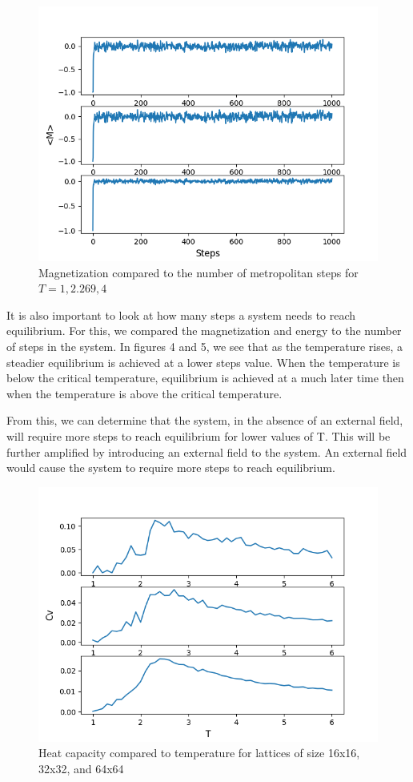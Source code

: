 \documentclass[pra,twocolumn,showpacs,amsmath,amssymb]{revtex4-2}
\begin{document}
\begin{figure}[t!]
\includegraphics[scale=0.50]{m_steps.png}
\caption{Magnetization compared to the number of metropolitan steps for $T = 1, 2.269, 4$}\label{autocorr}
\end{figure}

\par It is also important to look at how many steps a system needs to reach equilibrium. For this, we compared the magnetization and energy to the number of steps in the system. In figures 4 and 5, we see that as the temperature rises, a steadier equilibrium is achieved at a lower steps value. When the temperature is below the critical temperature, equilibrium is achieved at a much later time then when the temperature is above the critical temperature.
\par From this, we can determine that the system, in the absence of an external field, will require more steps to reach equilibrium for lower values of T. This will be further amplified by introducing an external field to the system. An external field would cause the system to require more steps to reach equilibrium.

\begin{figure}[t!]
\includegraphics[scale=0.50]{cv_t.png}
\caption{Heat capacity compared to temperature for lattices of size 16x16, 32x32, and 64x64}\label{Poincare0.5}
\end{figure}
\end{document}
